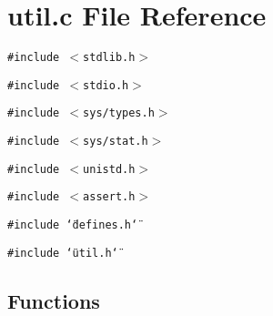 \section{util.c File Reference}
\label{util_8c}
{\tt \#include $<$stdlib.h$>$}\par
{\tt \#include $<$stdio.h$>$}\par
{\tt \#include $<$sys/types.h$>$}\par
{\tt \#include $<$sys/stat.h$>$}\par
{\tt \#include $<$unistd.h$>$}\par
{\tt \#include $<$assert.h$>$}\par
{\tt \#include \char`\"{}defines.h\char`\"{}}\par
{\tt \#include \char`\"{}util.h\char`\"{}}\par
\subsection*{Functions}
